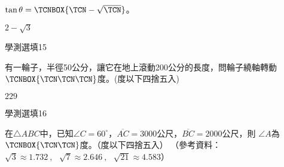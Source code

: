 \begin{QUESTIONS}
\begin{QUESTION}
\begin{QBODY}
            $\tan \theta = \TCNBOX{ \TCN-\sqrt{\TCN} }$。
        \end{QBODY}
        \begin{QFROMS}
        \end{QFROMS}
        \begin{QTAGS}\end{QTAGS}
        \begin{QANS}
            $2-\sqrt{3}$
        \end{QANS}
        \begin{QSOLLIST}
        \end{QSOLLIST}
        \begin{QEMPTYSPACE}
        \end{QEMPTYSPACE}
    \end{QUESTION}
    \begin{QUESTION}
        \begin{ExamInfo}{88}{學測}{選填}{15}
        \end{ExamInfo}
        \begin{ExamAnsRateInfo}{}{}{}{}
        \end{ExamAnsRateInfo}
        \begin{QBODY}
            有一輪子，半徑50公分，讓它在地上滾動200公分的長度，問輪子繞軸轉動$\TCNBOX{\TCN\TCN\TCN}$度。(度以下四捨五入)
        \end{QBODY}
        \begin{QFROMS}
        \end{QFROMS}
        \begin{QTAGS}\end{QTAGS}
        \begin{QANS}
            $229$
        \end{QANS}
        \begin{QSOLLIST}
        \end{QSOLLIST}
        \begin{QEMPTYSPACE}
        \end{QEMPTYSPACE}
    \end{QUESTION}
    \begin{QUESTION}
        \begin{ExamInfo}{88}{學測}{選填}{16}
        \end{ExamInfo}
        \begin{ExamAnsRateInfo}{}{}{}{}
        \end{ExamAnsRateInfo}
        \begin{QBODY}
            在$\triangle ABC$中，已知$\angle C=60^\circ$，$\overline{AC}=3000$公尺，$\overline{BC}=2000$公尺，則 $\angle A$為
            $\TCNBOX{\TCN\TCN}$度。（度以下四捨五入）
            （參考資料：$\sqrt{3}\approx 1.732\ ,\ \ \ \sqrt{7}\approx 2.646\ ,\ \ \ \sqrt{21}\approx 4.583$）
            

\end{QBODY}
\end{QUESTION}
\end{QUESTIONS}
